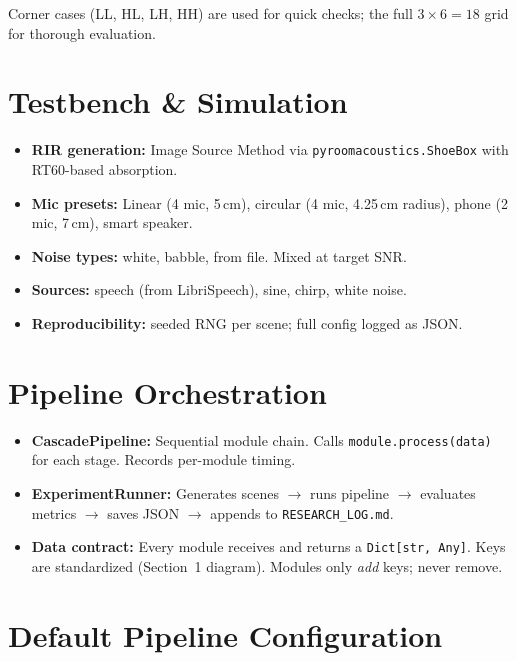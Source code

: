 \documentclass[11pt,a4paper]{article}
\begin{document}
\noindent Corner cases (LL, HL, LH, HH) are used for quick checks; the full $3\!\times\!6 = 18$ grid for thorough evaluation.

\section{Testbench \& Simulation}

\begin{itemize}[nosep]
\item \textbf{RIR generation:} Image Source Method via \texttt{pyroomacoustics.ShoeBox} with RT60-based absorption.
\item \textbf{Mic presets:} Linear (4 mic, 5\,cm), circular (4 mic, 4.25\,cm radius), phone (2 mic, 7\,cm), smart speaker.
\item \textbf{Noise types:} white, babble, from file. Mixed at target SNR.
\item \textbf{Sources:} speech (from LibriSpeech), sine, chirp, white noise.
\item \textbf{Reproducibility:} seeded RNG per scene; full config logged as JSON.
\end{itemize}

\section{Pipeline Orchestration}

\begin{itemize}[nosep]
\item \textbf{CascadePipeline:} Sequential module chain. Calls \texttt{module.process(data)} for each stage. Records per-module timing.
\item \textbf{ExperimentRunner:} Generates scenes $\to$ runs pipeline $\to$ evaluates metrics $\to$ saves JSON $\to$ appends to \texttt{RESEARCH\_LOG.md}.
\item \textbf{Data contract:} Every module receives and returns a \texttt{Dict[str, Any]}. Keys are standardized (Section~1 diagram). Modules only \emph{add} keys; never remove.
\end{itemize}

\section{Default Pipeline Configuration}
\end{document}
